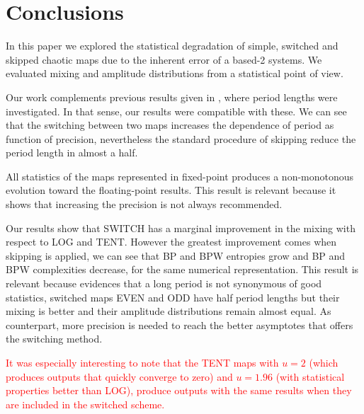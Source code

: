 \section{Conclusions}
\label{sec:conclusions}

In this paper we explored the statistical degradation of simple, switched and skipped chaotic maps due to the inherent error of a based-2 systems.
We evaluated mixing and amplitude distributions from a statistical point of view.

Our work complements previous results given in \cite{Nagaraj2008}, where period lengths were investigated.
In that sense, our results were compatible with these.
We can see that the switching between two maps increases the dependence of period as function of precision, nevertheless the standard procedure of skipping reduce the period length in almost a half.

All statistics of the maps represented in fixed-point produces a non-monotonous evolution toward the floating-point results.
This result is relevant because it shows that increasing the precision is not always recommended.

Our results show that SWITCH has a marginal improvement in the mixing with respect to LOG and TENT.
However the greatest improvement comes when skipping is applied, we can see that BP and BPW entropies grow and BP and BPW complexities decrease, for the same numerical representation.
This result is relevant because evidences that a long period is not synonymous of good statistics, switched maps EVEN and ODD have half period lengths but their mixing is better and their amplitude distributions remain almost equal.
As counterpart, more precision is needed to reach the better asymptotes that offers the switching method.

\textcolor{red}{It was especially interesting to note that the TENT maps with $u = 2$ (which produces outputs that quickly converge to zero) and $u = 1.96$ (with statistical properties better than LOG), produce outputs with the same results when they are included in the switched scheme.}